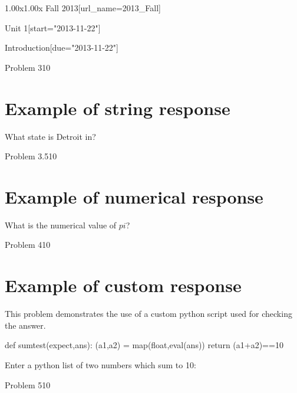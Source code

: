 \documentclass[12pt]{article}
\begin{document}
\begin{edXcourse}{1.00x}{1.00x Fall 2013}[url_name=2013_Fall]
\begin{edXchapter}{Unit 1}[start="2013-11-22"]
\begin{edXsection}{Introduction}[due="2013-11-22"]
\begin{edXproblem}{Problem 3}{10}

\section{Example of string response}  

What state is Detroit in?


\end{edXproblem}


\begin{edXproblem}{Problem 3.5}{10}

\section{Example of numerical response}  

What is the numerical value of $pi$?


\end{edXproblem}


\begin{edXproblem}{Problem 4}{10}

\section{Example of custom response}  

This problem demonstrates the use of a custom python script used for
checking the answer.

\begin{edXscript}
def sumtest(expect,ans):
    (a1,a2) = map(float,eval(ans))
    return (a1+a2)==10
\end{edXscript}

Enter a python list of two numbers which sum to 10:


\end{edXproblem}


\begin{edXproblem}{Problem 5}{10}


\end{edXproblem}
\end{edXsection}
\end{edXchapter}
\end{edXcourse}
\end{document}
